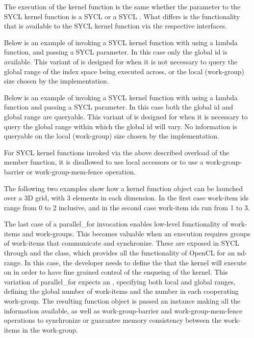 The execution of the kernel function is the same whether the parameter to the SYCL kernel function is
a SYCL  or a SYCL .
What differs is the functionality that is available to the SYCL kernel function via the respective interfaces.

Below is an example of invoking a SYCL kernel function with  using a lambda function,
and passing a SYCL  parameter. In this case only the global id is available. This variant of
 is designed for when it is not necessary to query the global range of the index space
being executed across, or the local (work-group) size chosen by the implementation.



Below is an example of invoking a SYCL kernel function with  using a lambda function
and passing a SYCL  parameter. In this case both the global id and global range are queryable.
This variant of  is designed for when it is necessary to query the global range within
which the global id will vary.  No information is queryable on the local (work-group) size chosen by the
implementation.



For SYCL kernel functions invoked via the above described overload of the  member function,
it is disallowed to use local accessors or to use a \gls{work-group-barrier} or \gls{work-group-mem-fence} operation.

The following two examples show how a kernel function object can be launched
over a 3D grid, with 3 elements in each dimension. In the first case
work-item ids range from 0 to 2 inclusive, and in the second case
work-item ids run from 1 to 3.



The last case of a parallel_for invocation enables
low-level functionality of work-items and work-groups. This becomes
valuable when an execution requires groups of work-items that communicate and
synchronize. These are exposed in SYCL through 
and the  class, 
which provides all the functionality of OpenCL for an nd-range.
In this case, the developer needs to define the
  that the kernel will execute on in order to
 have fine grained  control of the enqueing of the kernel. 
 This variation of parallel_for expects an
 , specifying both local and global ranges,
 defining the global
 number of work-items and the number in each cooperating work-group.
 The resulting function object is passed an 
 instance making all the information available, as well as
 \gls{work-group-barrier} and \gls{work-group-mem-fence} operations
 to synchronize or guarantee memory consistency between the \gls{work-item}s in the \gls{work-group}.

